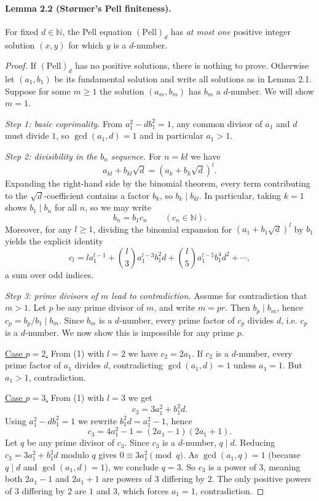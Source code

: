 \paragraph{Lemma 2.2 (St\o rmer's Pell finiteness).}
For fixed $d\in\mathbb{N}$, the Pell equation $(\mathrm{Pell})_d$ has \emph{at most one} positive integer solution $(x,y)$ for which $y$ is a $d$-number.
\begin{proof}
If $(\mathrm{Pell})_d$ has no positive solutions, there is nothing to prove.
Otherwise let $(a_1,b_1)$ be its fundamental solution and write all solutions as in Lemma 2.1.
Suppose for some $m\ge 1$ the solution $(a_m,b_m)$ has $b_m$ a $d$-number.
We will show $m=1$.

\smallskip
\noindent\emph{Step 1: basic coprimality.}
From $a_1^2-db_1^2=1$, any common divisor of $a_1$ and $d$ must divide $1$, so
$\gcd(a_1,d)=1$ and in particular $a_1>1$.

\smallskip
\noindent\emph{Step 2: divisibility in the $b_n$ sequence.}
For $n=kl$ we have
\[
 a_{kl}+b_{kl}\sqrt d = (a_k+b_k\sqrt d)^l.
\]
Expanding the right-hand side by the binomial theorem, every term contributing to the $\sqrt d$-coefficient contains a factor $b_k$, so $b_k\mid b_{kl}$.
In particular, taking $k=1$ shows $b_1\mid b_n$ for all $n$, so we may write
\[
 b_n=b_1c_n\qquad (c_n\in\mathbb{N}).
\]
Moreover, for any $l\ge 1$, dividing the binomial expansion for $(a_1+b_1\sqrt d)^l$ by $b_1$ yields the explicit identity
\[
 c_l = l a_1^{l-1} + \binom{l}{3} a_1^{l-3} b_1^2 d + \binom{l}{5} a_1^{l-5} b_1^4 d^2 + \cdots,
\tag{1}
\]
a sum over odd indices.

\smallskip
\noindent\emph{Step 3: prime divisors of $m$ lead to contradiction.}
Assume for contradiction that $m>1$.
Let $p$ be any prime divisor of $m$, and write $m=pr$.
Then $b_p\mid b_m$, hence $c_p=b_p/b_1\mid b_m$.
Since $b_m$ is a $d$-number, every prime factor of $c_p$ divides $d$, i.e. $c_p$ is a $d$-number.
We now show this is impossible for any prime $p$.

\smallskip
\noindent\underline{Case $p=2$.}
From (1) with $l=2$ we have $c_2=2a_1$.
If $c_2$ is a $d$-number, every prime factor of $a_1$ divides $d$, contradicting $\gcd(a_1,d)=1$ unless $a_1=1$.
But $a_1>1$, contradiction.

\smallskip
\noindent\underline{Case $p=3$.}
From (1) with $l=3$ we get
\[
 c_3 = 3a_1^2 + b_1^2 d.
\]
Using $a_1^2-db_1^2=1$ we rewrite $b_1^2 d=a_1^2-1$, hence
\[
 c_3 = 4a_1^2-1=(2a_1-1)(2a_1+1).
\]
Let $q$ be any prime divisor of $c_3$. Since $c_3$ is a $d$-number, $q\mid d$.
Reducing $c_3=3a_1^2+b_1^2d$ modulo $q$ gives $0\equiv 3a_1^2\pmod q$.
As $\gcd(a_1,q)=1$ (because $q\mid d$ and $\gcd(a_1,d)=1$), we conclude $q=3$.
So $c_3$ is a power of $3$, meaning both $2a_1-1$ and $2a_1+1$ are powers of $3$ differing by $2$.
The only positive powers of $3$ differing by $2$ are $1$ and $3$, which forces $a_1=1$, contradiction.


\end{proof}

